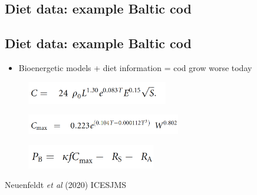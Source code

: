 \documentclass[
  letterpaper,
  DIV=11,
  numbers=noendperiod]{scrartcl}
\providecommand{\tightlist}{%
  \setlength{\itemsep}{0pt}\setlength{\parskip}{0pt}}\usepackage{longtable,booktabs,array}
\begin{document}
\hypertarget{diet-data-example-baltic-cod}{%
\subsection{Diet data: example Baltic
cod}\label{diet-data-example-baltic-cod}}

\hypertarget{diet-data-example-baltic-cod-1}{%
\subsection{Diet data: example Baltic
cod}\label{diet-data-example-baltic-cod-1}}

\begin{itemize}
\tightlist
\item
  Bioenergetic models + diet information = cod grow worse today
\end{itemize}

\begin{figure}

{\centering \includegraphics[width=0.55\textwidth,height=\textheight]{images/eq1.png}

}

\end{figure}

\begin{figure}

{\centering \includegraphics[width=0.6\textwidth,height=\textheight]{images/eq2.png}

}

\end{figure}

\begin{figure}

{\centering \includegraphics[width=0.5\textwidth,height=\textheight]{images/eq3.png}

}

\end{figure}

Neuenfeldt \emph{et al} (2020) ICESJMS
\end{document}
